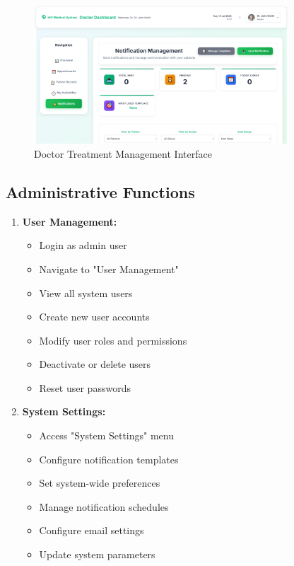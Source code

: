 \documentclass[12pt,a4paper]{article}
\begin{document}
\begin{figure}[H]
\centering
\includegraphics[width=0.85\textwidth]{doctor_treatment.png}
\caption{Doctor Treatment Management Interface}
\label{fig:doctor-treatment}
\end{figure}

\subsection{Administrative Functions}

\begin{enumerate}
    \item \textbf{User Management:}
    \begin{itemize}
        \item Login as admin user
        \item Navigate to "User Management"
        \item View all system users
        \item Create new user accounts
        \item Modify user roles and permissions
        \item Deactivate or delete users
        \item Reset user passwords
    \end{itemize}
    
    \item \textbf{System Settings:}
    \begin{itemize}
        \item Access "System Settings" menu
        \item Configure notification templates
        \item Set system-wide preferences
        \item Manage notification schedules
        \item Configure email settings
        \item Update system parameters
    \end{itemize}
\end{enumerate}
\end{document}

